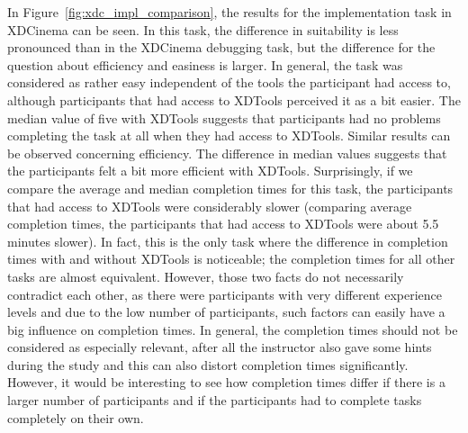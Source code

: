 In Figure~\ref{fig:xdc_impl_comparison}, the results for the implementation task in XDCinema can be seen. In this task, the difference in suitability is less pronounced than in the XDCinema debugging task, but the difference for the question about efficiency and easiness is larger. In general, the task was considered as rather easy independent of the tools the participant had access to, although participants that had access to XDTools perceived it as a bit easier. The median value of five with XDTools suggests that participants had no problems completing the task at all when they had access to XDTools. Similar results can be observed concerning efficiency. The difference in median values suggests that the participants felt a bit more efficient with XDTools. Surprisingly, if we compare the average and median completion times for this task, the participants that had access to XDTools were considerably slower (comparing average completion times, the participants that had access to XDTools were about 5.5 minutes slower). In fact, this is the only task where the difference in completion times with and without XDTools is noticeable; the completion times for all other tasks are almost equivalent. However, those two facts do not necessarily contradict each other, as there were participants with very different experience levels and due to the low number of participants, such factors can easily have a big influence on completion times. In general, the completion times should not be considered as especially relevant, after all the instructor also gave some hints during the study and this can also distort completion times significantly. However, it would be interesting to see how completion times differ if there is a larger number of participants and if the participants had to complete tasks completely on their own. 

